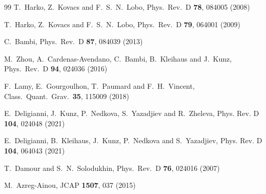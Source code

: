 \documentclass[twocolumn,showpacs,preprintnumbers,amsmath,amssymb,floatfix]{revtex4-1}
\begin{document}
\begin{thebibliography}{99}
  T.~Harko, Z.~Kovacs and F.~S.~N.~Lobo,
  Phys.\ Rev.\ D {\bf 78}, 084005 (2008)

  T.~Harko, Z.~Kovacs and F.~S.~N.~Lobo,
  Phys.\ Rev.\ D {\bf 79}, 064001 (2009)

  C.~Bambi,
  Phys.\ Rev.\ D {\bf 87}, 084039 (2013)

  M.~Zhou, A.~Cardenas-Avendano, C.~Bambi, B.~Kleihaus and J.~Kunz,
  Phys.\ Rev.\ D {\bf 94}, 024036 (2016)

  F.~Lamy, E.~Gourgoulhon, T.~Paumard and F.~H.~Vincent,
  Class.\ Quant.\ Grav.\  {\bf 35},   115009 (2018)

E.~Deligianni, J.~Kunz, P.~Nedkova, S.~Yazadjiev and R.~Zheleva,
Phys. Rev. D \textbf{104},  024048 (2021)

E.~Deligianni, B.~Kleihaus, J.~Kunz, P.~Nedkova and S.~Yazadjiev,
Phys. Rev. D \textbf{104},  064043 (2021)

  T.~Damour and S.~N.~Solodukhin,
  Phys.\ Rev.\ D {\bf 76}, 024016 (2007)

  M.~Azreg-Ainou,
  JCAP {\bf 1507}, 037 (2015)


\end{thebibliography}
\end{document}
